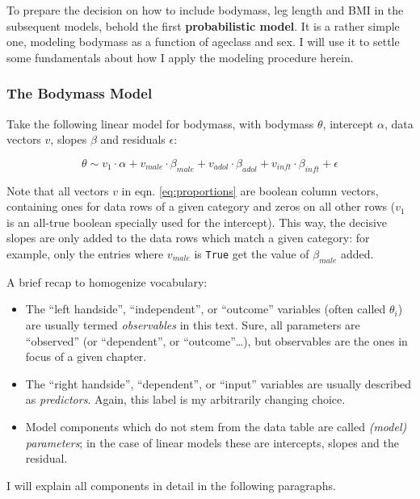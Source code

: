 To prepare the decision on how to include bodymass, leg length and BMI in the subsequent models, behold the first \textbf{probabilistic model}.
It is a rather simple one, modeling bodymass as a function of ageclass and sex.
I will use it to settle some fundamentals about how I apply the modeling procedure herein.

\subsubsection{The Bodymass Model}
\label{sec:orge4d1e9b}
Take the following linear model for bodymass, with bodymass \(\theta\), intercept \(\alpha\), data vectors \(v\), slopes \(\beta\) and residuals \(\epsilon\):

\begin{equation} \theta \sim v_{1}\cdot\alpha + v_{male}\cdot\beta_{male} + v_{adol}\cdot\beta_{adol} + v_{inft}\cdot\beta_{inft} + \epsilon \label{eq:proportions} \end{equation}

Note that all vectors \(v\) in eqn. \eqref{eq:proportions} are boolean column vectors, containing ones for data rows of a given category and zeros on all other rows (\(v_{1}\) is an all-true boolean specially used for the intercept).
This way, the decisive slopes are only added to the data rows which match a given category: for example, only the entries where \(v_{male}\) is \texttt{True} get the value of \(\beta_{male}\) added.

A brief recap to homogenize vocabulary:
\begin{itemize}
\item The ``left handside'', ``independent'', or ``outcome'' variables (often called \(\theta_{i}\)) are usually termed \emph{observables} in this text. Sure, all parameters are ``observed'' (or ``dependent'', or ``outcome''\ldots{}), but observables are the ones in focus of a given chapter.
\item The ``right handside'', ``dependent'', or ``input'' variables are usually described as \emph{predictors}. Again, this label is my arbitrarily changing choice.
\item Model components which do not stem from the data table are called \emph{(model) parameters}; in the case of linear models these are intercepts, slopes and the residual.
\end{itemize}

I will explain all components in detail in the following paragraphs.

